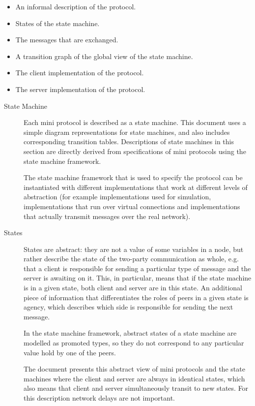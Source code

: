 \begin{itemize}
\item An informal description of the protocol.
\item States of the state machine.
\item The messages that are exchanged.
\item A transition graph of the global view of the state machine.
\item The client implementation of the protocol.
\item The server implementation of the protocol.
\end{itemize}

\begin{description}
\item[State Machine]
  Each mini protocol is described as a state machine.
  This document uses a simple diagram representations for state machines, and
  also includes corresponding transition tables.
  Descriptions of state machines in this section are directly derived from
  specifications of mini protocols using the state machine framework.

  The state machine framework that is used to specify the protocol can be instantiated
  with different implementations that work at different levels of abstraction
  (for example implementations used for simulation, implementations that run over virtual
  connections and implementations that actually transmit messages over the real network).


\item[States]
  States are abstract: they are not a value of some variables in a node, but
  rather describe the state of the two-party communication as whole, e.g.
  that a client is responsible for sending a particular type of message and
  the server is awaiting on it.  This, in particular, means that if the state
  machine is in a given state, both client and server are in this state.
  An additional piece of information that differentiates the roles of peers in
  a given state is agency, which describes which side is responsible for
  sending the next message.

  In the state machine framework, abstract states of a state machine are
  modelled as promoted types, so they do not correspond to any particular
  value hold by one of the peers.

  The document presents this abstract view of mini protocols and the state
  machines where the client and server are always in identical states, which
  also means that client and server simultaneously transit to new states.
  For this description network delays are not important.


\end{description}
